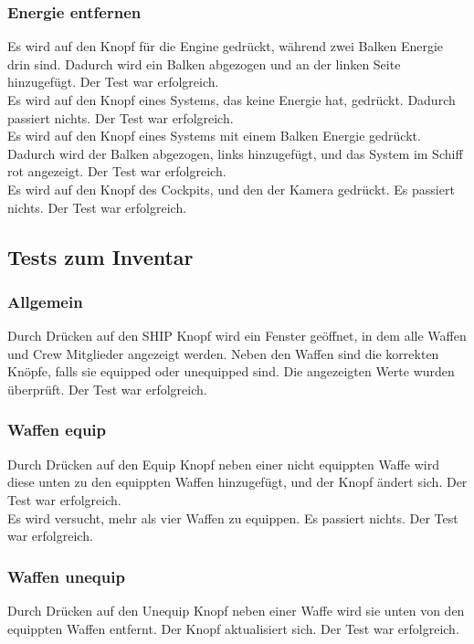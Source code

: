 \documentclass[fontsize=12pt,paper=a4,twoside]{scrartcl}
\begin{document}
\subsubsection{Energie entfernen}
Es wird auf den Knopf für die Engine gedrückt, während zwei Balken Energie drin sind. Dadurch wird ein Balken abgezogen und an der linken Seite hinzugefügt. Der Test war erfolgreich. \\
Es wird auf den Knopf eines Systems, das keine Energie hat, gedrückt. Dadurch passiert nichts. Der Test war erfolgreich. \\
Es wird auf den Knopf eines Systems mit einem Balken Energie gedrückt. Dadurch wird der Balken abgezogen, links hinzugefügt, und das System im Schiff rot angezeigt. Der Test war erfolgreich. \\
Es wird auf den Knopf des Cockpits, und  den der Kamera gedrückt. Es passiert nichts. Der Test war erfolgreich.  \\
\subsection{Tests zum Inventar}
\subsubsection{Allgemein}
Durch Drücken auf den SHIP Knopf wird ein Fenster geöffnet, in dem alle Waffen und Crew Mitglieder angezeigt werden. Neben den Waffen sind die korrekten Knöpfe, falls sie equipped oder unequipped sind. Die angezeigten Werte wurden überprüft. Der Test war erfolgreich. \\
\subsubsection{Waffen equip}
Durch Drücken auf den Equip Knopf neben einer nicht equippten Waffe wird diese unten zu den equippten Waffen hinzugefügt, und der Knopf ändert sich. Der Test war erfolgreich. \\
Es wird versucht, mehr als vier Waffen zu equippen. Es passiert nichts. Der Test war erfolgreich. \\
\subsubsection{Waffen unequip}
Durch Drücken auf den Unequip Knopf neben einer Waffe wird sie unten von den equippten Waffen entfernt. Der Knopf aktualisiert sich. Der Test war erfolgreich. \\
\end{document}
